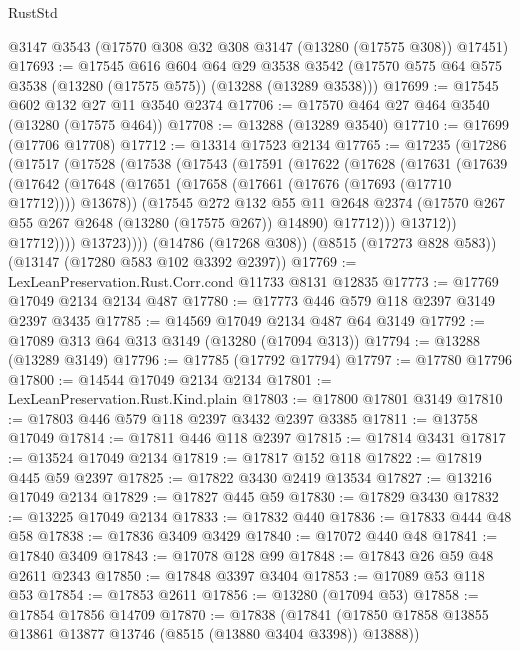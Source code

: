 \begin{lexlean}{RustStd}
\begin{coremodule}
    @3147
    @3543
    (@17570 @308 @32 @308 @3147 (@13280 (@17575 @308)) @17451)
@17693 := @17545
    @616
    @604
    @64
    @29
    @3538
    @3542
    (@17570 @575 @64 @575 @3538 (@13280 (@17575 @575)) (@13288 (@13289 @3538)))
@17699 := @17545 @602 @132 @27 @11 @3540 @2374
@17706 := @17570 @464 @27 @464 @3540 (@13280 (@17575 @464))
@17708 := @13288 (@13289 @3540)
@17710 := @17699 (@17706 @17708)
@17712 := @13314 @17523 @2134
@17765 := @17235
    (@17286
      (@17517
        (@17528
          (@17538
            (@17543
              (@17591
                (@17622
                  (@17628
                    (@17631
                      (@17639
                        (@17642
                          (@17648
                            (@17651 (@17658 (@17661 (@17676 (@17693 (@17710 @17712)))) @13678))
                            (@17545
                              @272
                              @132
                              @55
                              @11
                              @2648
                              @2374
                              (@17570 @267 @55 @267 @2648 (@13280 (@17575 @267)) @14890)
                              @17712)))
                        @13712))
                    @17712))))
            @13723))))
    (@14786 (@17268 @308))
    (@8515 (@17273 @828 @583))
    (@13147 (@17280 @583 @102 @3392 @2397))
@17769 := LexLeanPreservation.Rust.Corr.cond @11733 @8131 @12835
@17773 := @17769 @17049 @2134 @2134 @487
@17780 := @17773 @446 @579 @118 @2397 @3149 @2397 @3435
@17785 := @14569 @17049 @2134 @487 @64 @3149
@17792 := @17089 @313 @64 @313 @3149 (@13280 (@17094 @313))
@17794 := @13288 (@13289 @3149)
@17796 := @17785 (@17792 @17794)
@17797 := @17780 @17796
@17800 := @14544 @17049 @2134 @2134
@17801 := LexLeanPreservation.Rust.Kind.plain
@17803 := @17800 @17801 @3149
@17810 := @17803 @446 @579 @118 @2397 @3432 @2397 @3385
@17811 := @13758 @17049
@17814 := @17811 @446 @118 @2397
@17815 := @17814 @3431
@17817 := @13524 @17049 @2134
@17819 := @17817 @152 @118
@17822 := @17819 @445 @59 @2397
@17825 := @17822 @3430 @2419 @13534
@17827 := @13216 @17049 @2134
@17829 := @17827 @445 @59
@17830 := @17829 @3430
@17832 := @13225 @17049 @2134
@17833 := @17832 @440
@17836 := @17833 @444 @48 @58
@17838 := @17836 @3409 @3429
@17840 := @17072 @440 @48
@17841 := @17840 @3409
@17843 := @17078 @128 @99
@17848 := @17843 @26 @59 @48 @2611 @2343
@17850 := @17848 @3397 @3404
@17853 := @17089 @53 @118 @53
@17854 := @17853 @2611
@17856 := @13280 (@17094 @53)
@17858 := @17854 @17856 @14709
@17870 := @17838
    (@17841 (@17850 @17858 @13855 @13861 @13877 @13746 (@8515 (@13880 @3404 @3398)) @13888))

\end{coremodule}
\end{lexlean}
